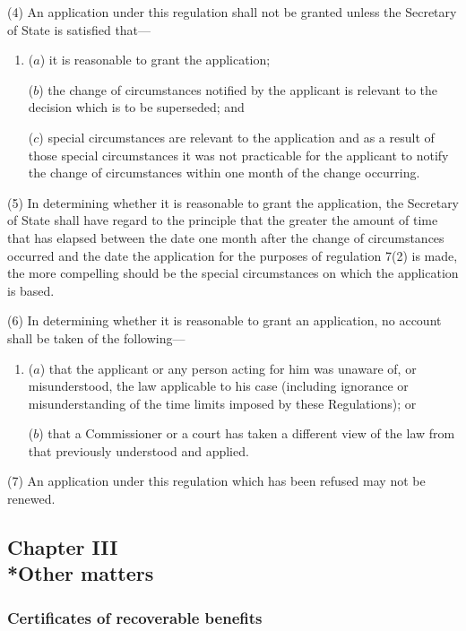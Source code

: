 \documentclass[12pt,a4paper]{article}
\begin{document}
(4) An application under this regulation shall not be granted unless the Secretary of State is satisfied that—
\begin{enumerate}\item[]
($a$) it is reasonable to grant the application;

($b$) the change of circumstances notified by the applicant is relevant to the decision which is to be superseded; and

($c$) special circumstances are relevant to the application and as a result of those special circumstances it was not practicable for the applicant to notify the change of circumstances within one month of the change occurring.
\end{enumerate}

(5) In determining whether it is reasonable to grant the application, the Secretary of State shall have regard to the principle that the greater the amount of time that has elapsed between the date one month after the change of circumstances occurred and the date the application for the purposes of regulation 7(2) is made, the more compelling should be the special circumstances on which the application is based.

(6) In determining whether it is reasonable to grant an application, no account shall be taken of the following—
\begin{enumerate}\item[]
($a$) that the applicant or any person acting for him was unaware of, or misunderstood, the law applicable to his case (including ignorance or misunderstanding of the time limits imposed by these Regulations); or

($b$) that a Commissioner or a court has taken a different view of the law from that previously understood and applied.
\end{enumerate}

(7) An application under this regulation which has been refused may not be renewed.

\subsection[Chapter III --- Other matters]{Chapter III\\*Other matters}

\subsubsection[9. Certificates of recoverable benefits]{Certificates of recoverable benefits}
\end{document}
